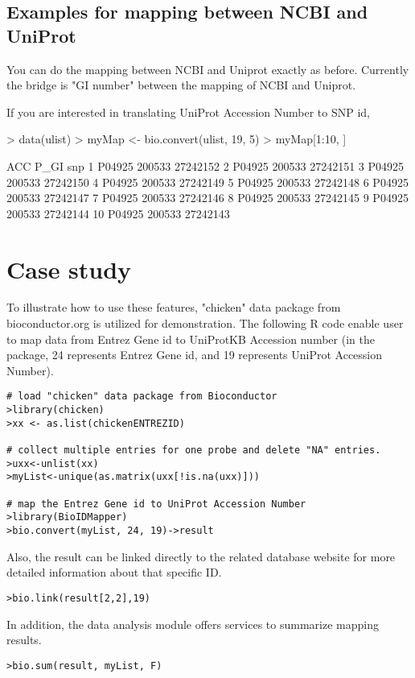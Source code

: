 \documentclass[a4paper]{article}
\begin{document}
\subsection{Examples for mapping between NCBI and UniProt }
You can do the mapping between NCBI and Uniprot exactly as before. Currently the bridge is "GI number" between the mapping of NCBI and Uniprot.  

If  you are interested in translating UniProt Accession Number to SNP id,

\begin{Schunk}
\begin{Sinput}
> data(ulist)
> myMap <- bio.convert(ulist, 19, 5)
> myMap[1:10, ]
\end{Sinput}
\begin{Soutput}
      ACC   P_GI      snp
1  P04925 200533 27242152
2  P04925 200533 27242151
3  P04925 200533 27242150
4  P04925 200533 27242149
5  P04925 200533 27242148
6  P04925 200533 27242147
7  P04925 200533 27242146
8  P04925 200533 27242145
9  P04925 200533 27242144
10 P04925 200533 27242143
\end{Soutput}
\end{Schunk}
\section{Case study}
To illustrate how to use these features, "chicken" data package from bioconductor.org is utilized for demonstration. The following R code enable user to map data from Entrez Gene id to UniProtKB Accession number (in the package, 24 represents Entrez Gene id, and 19 represents UniProt Accession Number).

\begin{verbatim}
# load "chicken" data package from Bioconductor
>library(chicken)
>xx <- as.list(chickenENTREZID)

# collect multiple entries for one probe and delete "NA" entries. 
>uxx<-unlist(xx)
>myList<-unique(as.matrix(uxx[!is.na(uxx)]))

# map the Entrez Gene id to UniProt Accession Number
>library(BioIDMapper)
>bio.convert(myList, 24, 19)->result
\end{verbatim}

Also, the result can be linked directly to the related database website for more detailed information about that specific ID.
\begin{verbatim}
>bio.link(result[2,2],19) 
\end{verbatim}
In addition, the data analysis module offers services to summarize mapping results. 
\begin{verbatim}
>bio.sum(result, myList, F)
\end{verbatim}
\end{document}

